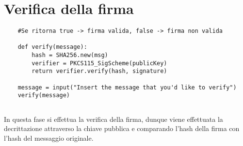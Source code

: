 \section{Verifica della firma}

\begin{lstlisting}
	#Se ritorna true -> firma valida, false -> firma non valida
	
	def verify(message):
		hash = SHA256.new(msg)
		verifier = PKCS115_SigScheme(publicKey)
		return verifier.verify(hash, signature)
	
	message = input("Insert the message that you'd like to verify")
	verify(message)
	
\end{lstlisting}

In questa fase si effettua la verifica della firma, dunque viene effettuata la decrittazione attraverso la chiave pubblica e comparando l'hash della firma con l'hash del messaggio originale.
